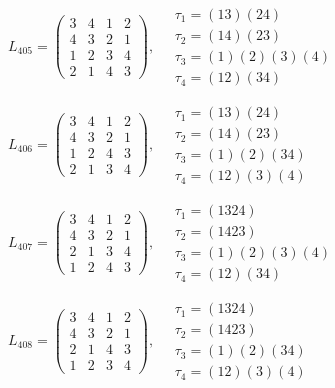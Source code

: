 $L_{405} = \begin{pmatrix} 3 & 4 & 1 & 2 \\ 4 & 3 & 2 & 1 \\ 1 & 2 & 3 & 4 \\ 2 & 1 & 4 & 3 \end{pmatrix}, \quad \begin{matrix} \tau_{1} = (1 3)(2 4) \\ \tau_{2} = (1 4)(2 3) \\ \tau_{3} = (1)(2)(3)(4) \\ \tau_{4} = (1 2)(3 4) \end{matrix}$

$L_{406} = \begin{pmatrix} 3 & 4 & 1 & 2 \\ 4 & 3 & 2 & 1 \\ 1 & 2 & 4 & 3 \\ 2 & 1 & 3 & 4 \end{pmatrix}, \quad \begin{matrix} \tau_{1} = (1 3)(2 4) \\ \tau_{2} = (1 4)(2 3) \\ \tau_{3} = (1)(2)(3 4) \\ \tau_{4} = (1 2)(3)(4) \end{matrix}$

$L_{407} = \begin{pmatrix} 3 & 4 & 1 & 2 \\ 4 & 3 & 2 & 1 \\ 2 & 1 & 3 & 4 \\ 1 & 2 & 4 & 3 \end{pmatrix}, \quad \begin{matrix} \tau_{1} = (1 3 2 4) \\ \tau_{2} = (1 4 2 3) \\ \tau_{3} = (1)(2)(3)(4) \\ \tau_{4} = (1 2)(3 4) \end{matrix}$

$L_{408} = \begin{pmatrix} 3 & 4 & 1 & 2 \\ 4 & 3 & 2 & 1 \\ 2 & 1 & 4 & 3 \\ 1 & 2 & 3 & 4 \end{pmatrix}, \quad \begin{matrix} \tau_{1} = (1 3 2 4) \\ \tau_{2} = (1 4 2 3) \\ \tau_{3} = (1)(2)(3 4) \\ \tau_{4} = (1 2)(3)(4) \end{matrix}$

